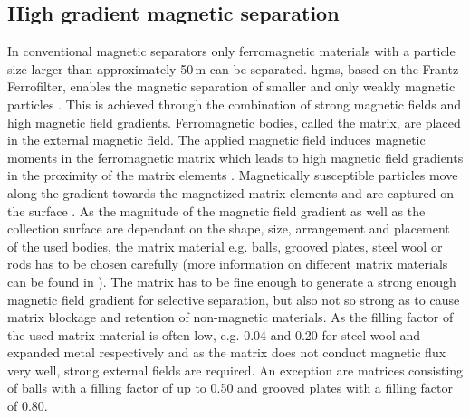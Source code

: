 \subsection{High gradient magnetic separation}
\label{subsec:HGMS}
In conventional magnetic separators only ferromagnetic materials with a particle size larger than approximately 50\,\textmu m can be separated. \Gls{hgms}, based on the Frantz Ferrofilter, enables the magnetic separation of smaller and only weakly magnetic particles \cite{frantz1937patent} \cite{ge2017magnetic}. This is achieved through the combination of strong magnetic fields and high magnetic field gradients. Ferromagnetic bodies, called the matrix, are placed in the external magnetic field. The applied magnetic field induces magnetic moments in the ferromagnetic matrix which leads to high magnetic field gradients in the proximity of the matrix elements \cite{shukla2006process}. Magnetically susceptible particles move along the gradient towards the magnetized matrix elements and are captured on the surface \cite{hoffmann2002novel}. As the magnitude of the magnetic field gradient as well as the collection surface are dependant on the shape, size, arrangement and placement of the used bodies, the matrix material e.g. balls, grooved plates, steel wool or rods has to be chosen carefully (more information on different matrix materials can be found in \cite{iacob2002high}\cite{kim2013effects}\cite{takayasu1981matrices}). The matrix has to be fine enough to generate a strong enough magnetic field gradient for selective separation, but also not so strong as to cause matrix blockage and retention of non-magnetic materials. As the filling factor of the used matrix material is often low, e.g. 0.04 and 0.20 for steel wool and expanded metal respectively and as the matrix does not conduct magnetic flux very well, strong external fields are required. An exception are matrices consisting of balls with a filling factor of up to 0.50 and grooved plates with a filling factor of 0.80. 



